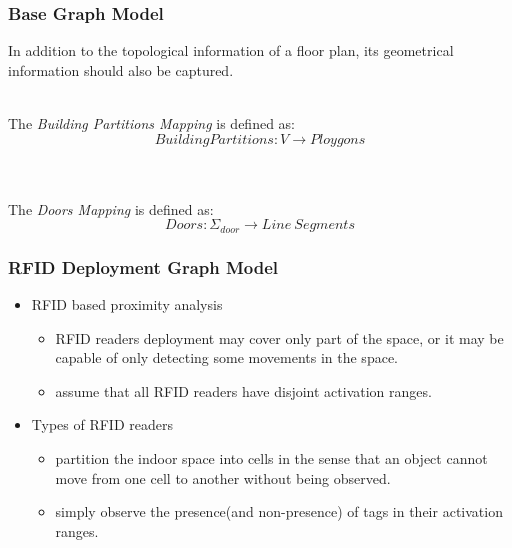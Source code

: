 
\begin{frame}
\frametitle{Base Graph Model}

  \small{In addition to the topological information of a floor plan, its geometrical information should also be captured.}
  \\~\\
  \pause

  The \textrm{\em Building Partitions Mapping} is defined as:
  \pause
  \begin{equation}
  BuildingPartitions: V \rightarrow Ploygons
  \end{equation}
  \\~\\
  \pause

  The \textrm{\em Doors Mapping} is defined as:
  \pause
  \begin{equation}
  Doors: \Sigma_{door} \rightarrow Line~Segments
  \end{equation}

\end{frame}



\begin{frame}
\frametitle{RFID Deployment Graph Model}

\begin{itemize}
  \item RFID based proximity analysis
      \begin{itemize}
        \item RFID readers deployment may cover only part of the space, or it may be capable of only detecting some movements in the space.
        \item assume that all RFID readers have disjoint activation ranges.
      \end{itemize}
  \item Types of RFID readers
      \begin{itemize}
        \item {} partition the indoor space into cells in the sense that an object cannot move from one cell to another without being observed.
        \item {} simply observe the presence(and non-presence) of tags in their activation ranges.
      \end{itemize}
\end{itemize}

\end{frame}

